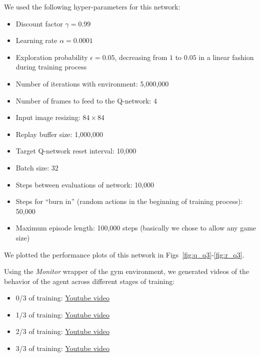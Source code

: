 \documentclass{article}
\begin{document}
We used the following hyper-parameters for this network:
\begin{itemize}
  \item Discount factor $\gamma=0.99$
  \item Learning rate $\alpha=0.0001$
  \item Exploration probability $\epsilon=0.05$, decreasing from $1$ to $0.05$ in a linear fashion during training process
  \item Number of iterations with environment: 5,000,000
  \item Number of frames to feed to the Q-network: 4
  \item Input image resizing: $84\times84$
  \item Replay buffer size: 1,000,000
  \item Target Q-network reset interval: 10,000
  \item Batch size: 32
  \item Steps between evaluations of network: 10,000
  \item Steps for ``burn in'' (random actions in the beginning of training process): 50,000
  \item Maximum episode length: 100,000 steps (basically we chose to allow any game size)
\end{itemize}

We plotted the performance plots of this network in Figs~\ref{fig:q_q3}-\ref{fig:r_q3}.



Using the \textit{Monitor} wrapper of the gym environment, we generated videos of the behavior of the agent across different stages of training:

\begin{itemize}
  \item 0/3 of training: \href{http://www.sharelatex.com}{Youtube video}
  \item 1/3 of training: \href{http://www.sharelatex.com}{Youtube video}
  \item 2/3 of training: \href{http://www.sharelatex.com}{Youtube video}
  \item 3/3 of training: \href{http://www.sharelatex.com}{Youtube video}
\end{itemize}
\end{document}
